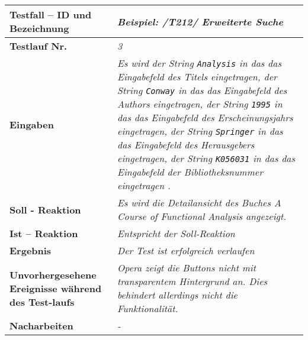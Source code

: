 \begin{longtable}{|p{5cm}|p{10cm}|}
\hline
\textbf{Testfall -- ID und Bezeichnung} & \textit{Beispiel: /T212/ Erweiterte
Suche} \\
\hline
\textbf{Testlauf Nr.} & \textit{3} \\
\hline
\textbf{Eingaben} & \textit{Es wird 
der String \lstinline{Analysis} in das das Eingabefeld des Titels eingetragen,
der String \lstinline{Conway} in das das Eingabefeld des Authors eingetragen,
der String \lstinline{1995} in das das Eingabefeld des Erscheinungsjahrs
eingetragen,
der String \lstinline{Springer} in das das Eingabefeld des Herausgebers
eingetragen,
der String \lstinline{K056031} in das das Eingabefeld der Bibliotheksnummer eingetragen
.} \\
\hline
\textbf{Soll - Reaktion} & \textit{Es wird die Detailansicht des Buches \emph{A
Course of Functional Analysis} angezeigt.}
} \\
\hline
\textbf{Ist -- Reaktion} & \textit{Entspricht der Soll-Reaktion} \\
\hline
\textbf{Ergebnis} & \textit{Der Test ist erfolgreich verlaufen} \\
\hline
\textbf{Unvorhergesehene Ereignisse w\"ahrend des Test-laufs } &
\textit{Opera zeigt die Buttons nicht mit transparentem Hintergrund an. Dies
behindert allerdings nicht die Funktionalität.} \\
\hline
\textbf{Nacharbeiten } & \textit{-} \\
\hline
\end{longtable}
